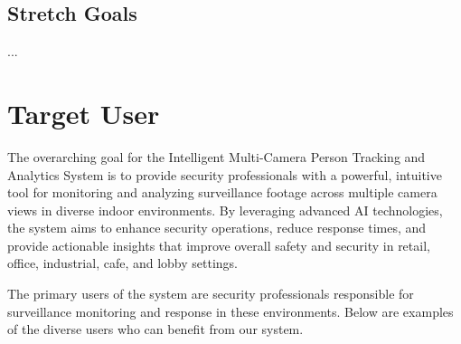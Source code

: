 \subsection{Stretch Goals}
\label{subsection:stretch-goals}
\begin{enumerate}[leftmargin=80pt]
    ...
\end{enumerate}


\section{Target User}
\label{section:target-user}

The overarching goal for the Intelligent Multi-Camera Person Tracking and Analytics System is to provide security professionals
with a powerful, intuitive tool for monitoring and analyzing surveillance footage across multiple camera views in diverse indoor environments.
By leveraging advanced AI technologies, the system aims to enhance security operations, reduce response times,
and provide actionable insights that improve overall safety and security in retail, office, industrial, cafe, and lobby settings.

The primary users of the system are security professionals responsible for surveillance monitoring and response in these environments.
Below are examples of the diverse users who can benefit from our system.

